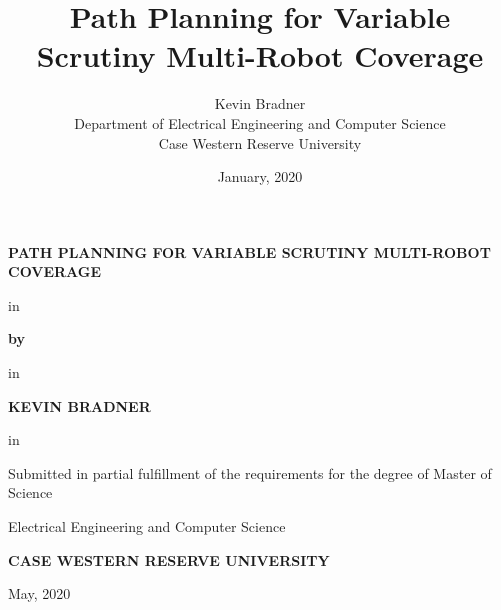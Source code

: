 \title{Path Planning for Variable Scrutiny Multi-Robot Coverage}

\author{Kevin Bradner\\Department of Electrical Engineering and Computer Science\\Case Western Reserve University}
\date{January, 2020}

\begin{center}
\begin{huge}
\textbf{PATH PLANNING FOR VARIABLE SCRUTINY MULTI-ROBOT COVERAGE}

 in

\textbf{by}

 in

\textbf{KEVIN BRADNER}
\end{huge}

\begin{Large}

 in

Submitted in partial fulfillment of the requirements for the degree of Master of Science

Electrical Engineering and Computer Science

\textbf{CASE WESTERN RESERVE UNIVERSITY}

\thispagestyle{empty}

May, 2020
\end{Large}
\end{center}

\clearpage

